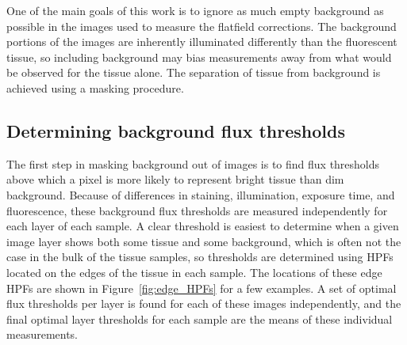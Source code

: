 \documentclass[letterpaper,11pt]{article}
\newcommand{\reffig}[1]{Figure~\ref{#1}}
\begin{document}
One of the main goals of this work is to ignore as much empty background as possible in the images used to measure the flatfield corrections. The background portions of the images are inherently illuminated differently than the fluorescent tissue, so including background may bias measurements away from what would be observed for the tissue alone. The separation of tissue from background is achieved using a masking procedure.

\subsection{Determining background flux thresholds}
\label{ssec:determining_background_flux_thresholds}

The first step in masking background out of images is to find flux thresholds above which a pixel is more likely to represent bright tissue than dim background. Because of differences in staining, illumination, exposure time, and fluorescence, these background flux thresholds are measured independently for each layer of each sample. A clear threshold is easiest to determine when a given image layer shows both some tissue and some background, which is often not the case in the bulk of the tissue samples, so thresholds are determined using HPFs located on the edges of the tissue in each sample. The locations of these edge HPFs are shown in \reffig{fig:edge_HPFs} for a few examples. A set of optimal flux thresholds per layer is found for each of these images independently, and the final optimal layer thresholds for each sample are the means of these individual measurements.
\end{document}
